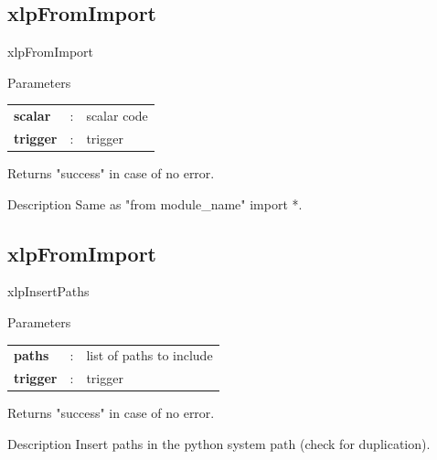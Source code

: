 \subsection{xlpFromImport}


\begin{xlpfunctitle}{xlpFromImport}

\begin{xlpfunc}{Parameters}
\begin{tabular}{p{3.5cm}cl}
\textbf{scalar}& : & scalar code\\
\textbf{trigger}& : & trigger \\
\end{tabular}
\end{xlpfunc}


\begin{xlpfunc}{Returns}
"success" in case of no error. 
\end{xlpfunc}

\begin{xlpfunc}{Description}
Same as "from module\_name" import *. 
\end{xlpfunc}
\end{xlpfunctitle}


\subsection{xlpFromImport}


\begin{xlpfunctitle}{xlpInsertPaths}

\begin{xlpfunc}{Parameters}
\begin{tabular}{p{3.5cm}cl}
\textbf{paths}& : & list of paths to include \\
\textbf{trigger}& : & trigger \\
\end{tabular}
\end{xlpfunc}


\begin{xlpfunc}{Returns}
"success" in case of no error.
\end{xlpfunc}

\begin{xlpfunc}{Description}
Insert paths in the python system path (check for duplication).
\end{xlpfunc}
\end{xlpfunctitle}


